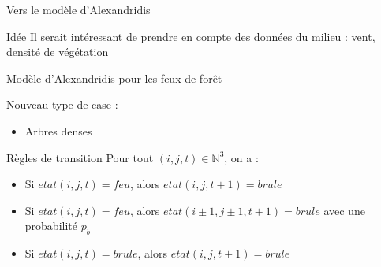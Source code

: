 \documentclass{beamer}
\begin{document}
\begin{frame}{Vers le modèle d'Alexandridis \hyperlink{jump}{\beamerbutton{ }} \hypertarget{6}{\beamerbutton{ }}}
    \begin{block}{Idée}
        Il serait intéressant de prendre en compte des données du milieu : vent, densité de végétation
    \end{block}
\end{frame}

\begin{frame}{Modèle d'Alexandridis pour les feux de forêt \hyperlink{jump}{\beamerbutton{ }} \hypertarget{7}{\beamerbutton{ }}}
    \begin{block}{Nouveau type de case :}
        \begin{itemize}
            \item Arbres denses
        \end{itemize}
    \end{block}

    \hspace{1cm}

    \begin{block}{Règles de transition}
        Pour tout $(i,j,t) \in \mathbb{N}^3$, on a :
        \begin{itemize}
            \item Si $etat(i, j, t) = feu$, alors $etat(i, j, t+1) = brule$
            \item Si $etat(i, j, t) = feu$, alors $etat(i \pm 1, j \pm 1, t+1) = brule$ avec une probabilité $p_b$
            \item Si $etat(i, j, t) = brule$, alors $etat(i, j, t+1) = brule$
        \end{itemize}
    \end{block}
\end{frame}
\end{document}
